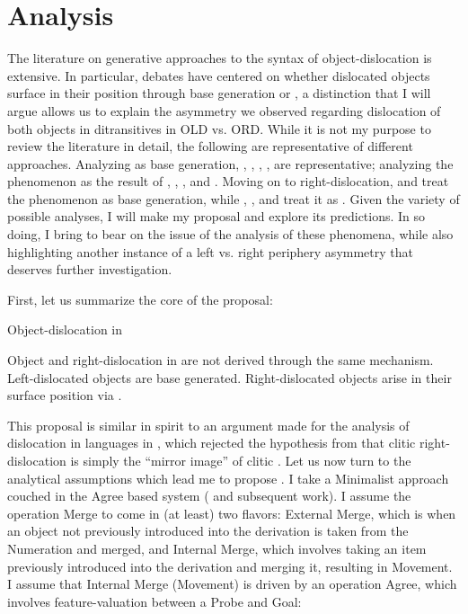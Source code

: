 \documentclass[output=paper
,newtxmath
,modfonts
,nonflat]{langsci/langscibook}
\begin{document}
\section{Analysis}\label{sec:ranero:4}

The literature on generative approaches to the syntax of object-dislocation is extensive. In particular, debates have centered on whether dislocated objects surface in their position through base generation or , a distinction that I will argue allows us to explain the asymmetry we observed regarding dislocation of both objects in ditransitives in OLD vs. ORD. While it is not my purpose to review the literature in detail, the following are representative of different approaches. Analyzing  as base generation, \citet{Cinque1990}, \citet{iatridou1995}, \citet{Anagnostopoulou1994}, \citet{Suñer2006}, \citet{De2007} are representative; analyzing the phenomenon as the result of , \citet{kayne1994}, \citet{Zubizarreta1998}, and \citet{zeller2009}. Moving on to right-dislocation, \citet{kayne1994} and \citet{Cardinaletti2002} treat the phenomenon as base generation, while \citet{Kayne1995}, \citet{Cecchetto1999}, \citet{Zeller2015} and \citet{Samek-Lodovici2016} treat it as . Given the variety of possible analyses, I will make my proposal and explore its predictions. In so doing, I bring  to bear on the issue of the analysis of these phenomena, while also highlighting another instance of a left vs. right periphery asymmetry that deserves further investigation.

First, let us summarize the core of the proposal:

\ea\label{ex:ranero:28}
Object-dislocation in  

\ea\label{ex:ranero:28a}
Object  and right-dislocation in  are not derived through the same mechanism.
\ex\label{ex:ranero:28b}
Left-dislocated objects are base generated.
\ex\label{ex:ranero:28c}
Right-dislocated objects arise in their surface position via .
\z
\z

This proposal is similar in spirit to an argument made for the analysis of dislocation in  languages in \citet{Cecchetto1999}, which rejected the hypothesis from \citet{Vallduví1992} that clitic right-dislocation is simply the “mirror image” of clitic . Let us now turn to the analytical assumptions which lead me to propose . I take a Minimalist approach couched in the Agree based system (\citealt{Chomsky2000} and subsequent work). I assume the operation Merge to come in (at least) two flavors: External Merge, which is when an object not previously introduced into the derivation is taken from the Numeration and merged, and Internal Merge, which involves taking an item previously introduced into the derivation and merging it, resulting in Movement. I assume that Internal Merge (Movement) is driven by an operation Agree, which involves feature-valuation between a Probe and Goal:
\end{document}
